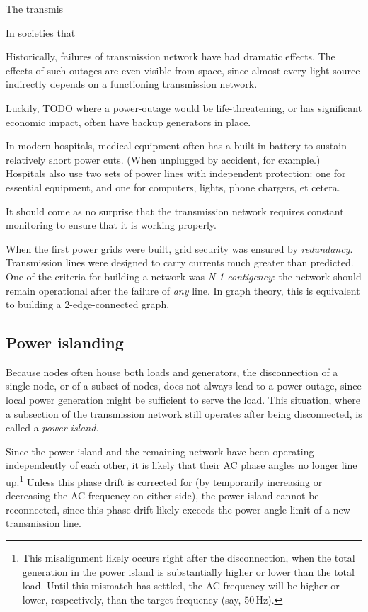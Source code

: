 \documentclass[main.tex]{subfiles}
\begin{document}
The transmis

In societies that 

Historically, failures of transmission network have had dramatic effects. The effects of 
such outages are even visible from space, since almost every light source indirectly depends on a functioning transmission network. 

Luckily, TODO where a power-outage would be life-threatening, or has significant economic impact, often have backup generators in place.

In modern hospitals, medical equipment often has a built-in battery to sustain relatively short power cuts. (When unplugged by accident, for example.) Hospitals also use two sets of power lines with independent protection: one for essential equipment, and one for computers, lights, phone chargers, et cetera.

It should come as no surprise that the transmission network requires constant monitoring to ensure that it is working properly. 

When the first power grids were built, grid security was ensured by \emph{redundancy}.  Transmission lines were designed to carry currents much greater than predicted. One of the criteria for building a network was \emph{N-1 contigency}: the network should remain operational after the failure of \emph{any} line. In graph theory, this is equivalent to building a 2-edge-connected graph.
\subsection{Power islanding}
Because nodes often house both loads and generators, the disconnection of a single node, or of a subset of nodes, does not always lead to a power outage, since local power generation might be sufficient to serve the load. This situation, where a subsection of the transmission network still operates after being disconnected, is called a \emph{power island}. 

Since the power island and the remaining network have been operating independently of each other, it is likely that their AC phase angles no longer line up.\footnote{This misalignment likely occurs right after the disconnection, when the total generation in the power island is substantially higher or lower than the total load. Until this mismatch has settled, the AC frequency will be higher or lower, respectively, than the target frequency (say, $50\,\si{\hertz}$).}
Unless this phase drift is corrected for (by temporarily increasing or decreasing the AC frequency on either side), the power island cannot be reconnected, since this phase drift likely exceeds the power angle limit of a new transmission line. 
\end{document}
